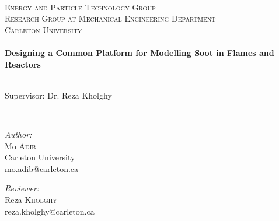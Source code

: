 \begin{titlepage}
\begin{center}

\newcommand{\myTitle}{Designing a Common Platform for Modelling Soot in Flames and Reactors}
\newcommand{\thisYear}{2023}



~\\[0.6cm]
\textsc{\LARGE Energy and Particle Technology Group}\\[0.6cm]	
\textsc{Research Group at Mechanical Engineering Department }\\
\textsc{Carleton University}\\[0.6cm]	

\HRule \\[0.5cm]
{ \huge \bfseries \myTitle}\\[0.2cm]
\HRule \\[1cm]

\begin{minipage}{0.35\textwidth}
Supervisor: Dr. Reza Kholghy\\
\end{minipage}\\[1.0cm]

\begin{minipage}{0.4\textwidth}
\begin{flushleft} \large
\emph{Author:}\\
    Mo \textsc{Adib}\\
    Carleton University\\
    mo.adib@carleton.ca
\end{flushleft}
\end{minipage}
\begin{minipage}{0.4\textwidth}
\begin{flushright} \large
\emph{Reviewer:} \\
Reza \textsc{Kholghy}\\
reza.kholghy@carleton.ca\\
\end{flushright}
\end{minipage}


\end{center}
\end{titlepage}
